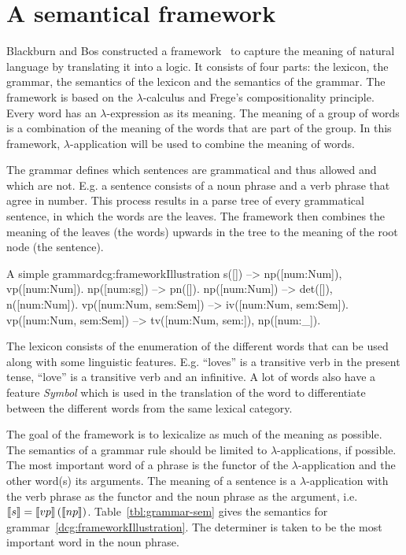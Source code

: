\section{A semantical framework}
Blackburn and Bos constructed a framework~\cite{Blackburn2005, Blackburn2006} to capture the meaning of natural language by translating it into a logic. It consists of four parts: the lexicon, the grammar, the semantics of the lexicon and the semantics of the grammar. The framework is based on the $\lambda$-calculus and Frege's compositionality principle. Every word has an $\lambda$-expression as its meaning. The meaning of a group of words is a combination of the meaning of the words that are part of the group. In this framework, $\lambda$-application will be used to combine the meaning of words.

The grammar defines which sentences are grammatical and thus allowed and which are not. E.g. a sentence consists of a noun phrase and a verb phrase that agree in number. This process results in a parse tree of every grammatical sentence, in which the words are the leaves. The framework then combines the meaning of the leaves (the words) upwards in the tree to the meaning of the root node (the sentence).

\begin{dcg}{A simple grammar}{dcg:frameworkIllustration}
s([]) -->
  np([num:Num]),
  vp([num:Num]).
np([num:sg]) -->
  pn([]).
np([num:Num]) -->
  det([]),
  n([num:Num]).
vp([num:Num, sem:Sem]) -->
  iv([num:Num, sem:Sem]).
vp([num:Num, sem:Sem]) -->
  tv([num:Num, sem:]),
  np([num:_]).
\end{dcg}

The lexicon consists of the enumeration of the different words that can be used along with some linguistic features. E.g. ``loves'' is a transitive verb in the present tense, ``love'' is a transitive verb and an infinitive. A lot of words also have a feature \textit{Symbol} which is used in the translation of the word to differentiate between the different words from the same lexical category.

The goal of the framework is to lexicalize as much of the meaning as possible. The semantics of a grammar rule should be limited to $\lambda$-applications, if possible. The most important word of a phrase is the functor of the $\lambda$-application and the other word(s) its arguments. The meaning of a sentence is a $\lambda$-application with the verb phrase as the functor and the noun phrase as the argument, i.e. $\llbracket s \rrbracket = \llbracket vp \rrbracket \left( \llbracket np \rrbracket \right)$. Table~\ref{tbl:grammar-sem} gives the semantics for grammar~\ref{dcg:frameworkIllustration}. The determiner is taken to be the most important word in the noun phrase.

